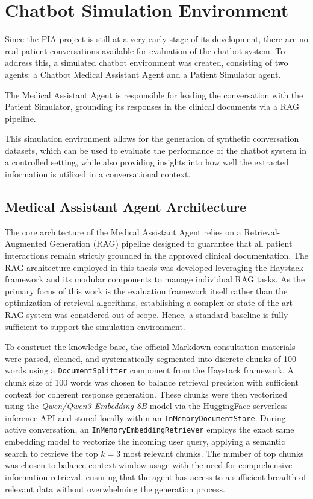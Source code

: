 \section{Chatbot Simulation Environment}

Since the PIA project is still at a very early stage of its development, there are no real patient conversations available for evaluation of the chatbot system.
To address this, a simulated chatbot environment was created, consisting of two agents: a Chatbot Medical Assistant Agent and a Patient Simulator agent.

The Medical Assistant Agent is responsible for leading the conversation with the Patient Simulator, grounding its responses in the clinical documents via a RAG pipeline.

This simulation environment allows for the generation of synthetic conversation datasets, which can be used to evaluate the performance of the chatbot system in a controlled setting, while also providing insights into how well the extracted information is utilized in a conversational context.

\subsection{Medical Assistant Agent Architecture}

The core architecture of the Medical Assistant Agent relies on a Retrieval-Augmented Generation (RAG) pipeline designed to guarantee that all patient interactions remain strictly grounded in the approved clinical documentation. 
The RAG architecture employed in this thesis was developed leveraging the Haystack framework \cite{pietschHaystackEndtoendNLP2019} and its modular components to manage individual RAG tasks. 
As the primary focus of this work is the evaluation framework itself rather than the optimization of retrieval algorithms, establishing a complex or state-of-the-art RAG system was considered out of scope.
Hence, a standard baseline is fully sufficient to support the simulation environment.

To construct the knowledge base, the official Markdown consultation materials were parsed, cleaned, and systematically segmented into discrete chunks of 100 words using a \texttt{DocumentSplitter} component from the Haystack framework.
A chunk size of 100 words was chosen to balance retrieval precision with sufficient context for coherent response generation.
These chunks were then vectorized using the \textit{Qwen/Qwen3-Embedding-8B} model via the HuggingFace serverless inference API and stored locally within an \texttt{InMemoryDocumentStore}. 
During active conversation, an \texttt{InMemoryEmbeddingRetriever} employs the exact same embedding model to vectorize the incoming user query, applying a semantic search to retrieve the top $k=3$ most relevant chunks.
The number of top chunks was chosen to balance context window usage with the need for comprehensive information retrieval, ensuring that the agent has access to a sufficient breadth of relevant data without overwhelming the generation process.

